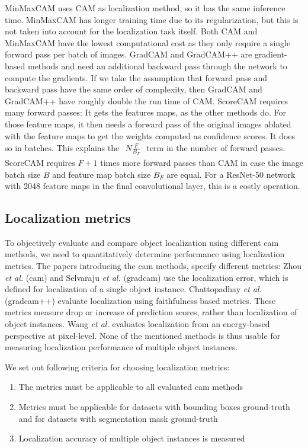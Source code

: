 MinMaxCAM uses CAM as localization method, so it has the same inference time. MinMaxCAM has longer training time due to its regularization, but this is not taken into account for the localization task itself. Both CAM and MinMaxCAM have the lowest computational cost as they only require a single forward pass per batch of images. GradCAM and GradCAM++ are gradient-based methods and need an additional backward pass through the network to compute the gradients. If we take the assumption that forward pass and backward pass have the same order of complexity, then GradCAM and GradCAM++ have roughly double the run time of CAM. ScoreCAM requires many forward passes: It gets the features maps, as the other methods do. For those feature maps, it then needs a forward pass of the original images ablated with the feature maps to get the weights computed as confidence scores. It does so in batches. This explains the $\begin{aligned}N\frac{F}{B_F}\end{aligned}$ term in the number of forward passes. ScoreCAM requires $F + 1$ times more forward passes than CAM in case the image batch size $B$ and feature map batch size $B_F$ are equal. For a ResNet-50 network with 2048 feature maps in the final convolutional layer, this is a costly operation.

\subsection{Localization metrics} \label{sec:localization_metrics}
To objectively evaluate and compare object localization using different \acrshort{cam} methods, we need to quantitatively determine performance using localization metrics. The papers introducing the \acrshort{cam} methods, specify different metrics: Zhou \textit{et al.} \cite{zhou2016cvpr} (\acrshort{cam}) and Selvaraju \textit{et al.} \cite{selvaraju2017grad} (\acrshort{gradcam}) use the localization error, which is defined for localization of a single object instance. Chattopadhay \textit{et al.} \cite{chattopadhay2018grad} (\acrshort{gradcam}++) evaluate localization using faithfulness based metrics. These metrics measure drop or increase of prediction scores, rather than localization of object instances. Wang \textit{et al.} \cite{wang2020score} evaluates localization from an energy-based perspective at pixel-level. None of the mentioned methods is thus usable for measuring localization performance of multiple object instances.

We set out following criteria for choosing localization metrics:
\begin{enumerate}
    \item The metrics must be applicable to all evaluated \acrshort{cam} methods
    \item Metrics must be applicable for datasets with bounding boxes ground-truth and for datasets with segmentation mask ground-truth
    \item Localization accuracy of multiple object instances is measured
\end{enumerate}

